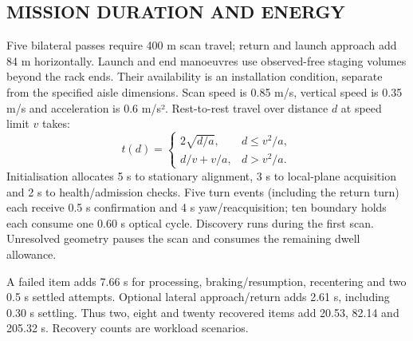 \documentclass[a4paper,11pt]{article}
\begin{document}
\subsection{M{\fontsize{9.2}{14}\selectfont ISSION} {\fontsize{9.2}{14}\selectfont DURATION} {\fontsize{9.2}{14}\selectfont AND} {\fontsize{9.2}{14}\selectfont ENERGY}}
Five bilateral passes require 400 m scan travel; return and launch approach add 84 m horizontally. Launch and end manoeuvres use observed-free staging volumes beyond the rack ends. Their availability is an installation condition, separate from the specified aisle dimensions. Scan speed is 0.85 m/s, vertical speed is 0.35 m/s and acceleration is 0.6 m/s². Rest-to-rest travel over distance $d$ at speed limit $v$ takes:
\begin{equation}t(d)=\begin{cases}2\sqrt{d/a},&d\le v^2/a,\\ d/v+v/a,&d>v^2/a.\end{cases}\end{equation}
Initialisation allocates 5 s to stationary alignment, 3 s to local-plane acquisition and 2 s to health/admission checks. Five turn events (including the return turn) each receive 0.5 s confirmation and 4 s yaw/reacquisition; ten boundary holds each consume one 0.60 s optical cycle. Discovery runs during the first scan. Unresolved geometry pauses the scan and consumes the remaining dwell allowance.

A failed item adds 7.66 s for processing, braking/resumption, recentering and two 0.5 s settled attempts. Optional lateral approach/return adds 2.61 s, including 0.30 s settling. Thus two, eight and twenty recovered items add 20.53, 82.14 and 205.32 s. Recovery counts are workload scenarios.
\end{document}
